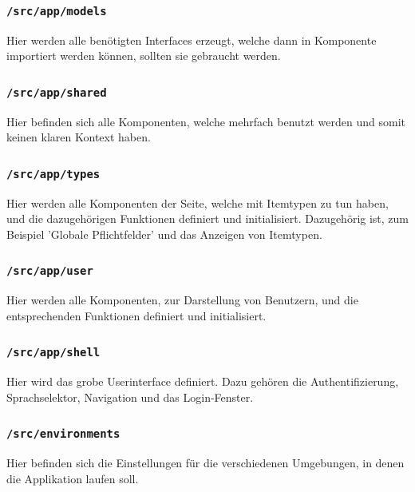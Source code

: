 \documentclass[11pt,a4paper]{report}
\begin{document}
	\subsubsection*{\texttt{/src/app/models}}
	Hier werden alle benötigten Interfaces erzeugt, welche dann in Komponente importiert werden können, sollten sie gebraucht werden.

	\subsubsection*{\texttt{/src/app/shared}}
	Hier befinden sich alle Komponenten, welche mehrfach benutzt werden und somit keinen klaren Kontext haben.
	
	\subsubsection*{\texttt{/src/app/types}}
	Hier werden alle Komponenten der Seite, welche mit Itemtypen zu tun haben, und die dazugehörigen Funktionen definiert und initialisiert.
	Dazugehörig ist, zum Beispiel 'Globale Pflichtfelder' und das Anzeigen von Itemtypen.
	
	\subsubsection*{\texttt{/src/app/user}}
	Hier werden alle Komponenten, zur Darstellung von Benutzern, und die entsprechenden Funktionen definiert und initialisiert.
	
	\subsubsection*{\texttt{/src/app/shell}}
	Hier wird das grobe Userinterface definiert. Dazu gehören die Authentifizierung, Sprachselektor, Navigation und das Login-Fenster.
	
	\subsubsection*{\texttt{/src/environments}}
	Hier befinden sich die Einstellungen für die verschiedenen Umgebungen, in denen die Applikation laufen soll.

\newpage
	
\end{document}
